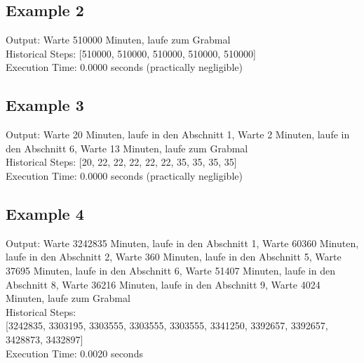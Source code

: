\documentclass[a4paper,10pt,english]{scrartcl}
\begin{document}
\subsection*{Example 2}
Output: Warte 510000 Minuten, laufe zum Grabmal\\
Historical Steps: [510000, 510000, 510000, 510000, 510000]\\
Execution Time: 0.0000 seconds (practically negligible)

\subsection*{Example 3}
Output: Warte 20 Minuten, laufe in den Abschnitt 1, Warte 2 Minuten, laufe in den Abschnitt 6, Warte 13 Minuten, laufe zum Grabmal\\
Historical Steps: [20, 22, 22, 22, 22, 22, 35, 35, 35, 35]\\
Execution Time: 0.0000 seconds (practically negligible)

\subsection*{Example 4}
Output: Warte 3242835 Minuten, laufe in den Abschnitt 1, Warte 60360 Minuten, laufe in den Abschnitt 2, Warte 360 Minuten, laufe in den Abschnitt 5, Warte 37695 Minuten, laufe in den Abschnitt 6, Warte 51407 Minuten, laufe in den Abschnitt 8, Warte 36216 Minuten, laufe in den Abschnitt 9, Warte 4024 Minuten, laufe zum Grabmal\\
Historical Steps:\\
{[3242835, 3303195, 3303555, 3303555, 3303555, 3341250, 3392657, 3392657, 3428873, 3432897]}\\
Execution Time: 0.0020 seconds
\end{document}

